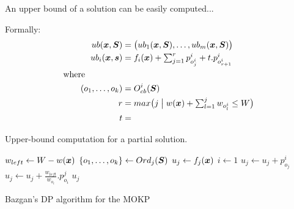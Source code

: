 An upper bound of a solution can be easily computed...

Formally:
\begin{align*}
    ub(\boldsymbol{x}, \boldsymbol{S}) &= \big(ub_1(\boldsymbol{x}, \boldsymbol{S}), \ldots, ub_m(\boldsymbol{x}, \boldsymbol{S})\big) \\
    ub_i(\boldsymbol{x}, \boldsymbol{s}) &= f_i(\boldsymbol{x}) + \textstyle\sum^r_{j=1} p^i_{o^i_j} + t.p^i_{o^i_{r+1}}\\
  \text{where} \phantom{mmmmm} \\
    (o_1, \ldots, o_k) &= O_{cb}^i(\boldsymbol{S}) \\
    r &= max\big( j \;\big|\; w(\boldsymbol{x}) + \textstyle\sum_{l = 1}^j w_{o^i_l} \leq W \big) \\
    t &= \textstyle
\end{align*}

\begin{algorithm}
  \caption{Upper-bound computation for a partial solution.}
  \label{alg:up}
  \begin{algorithmic}[1]
      \State $w_{left} \gets W - w(\boldsymbol{x})$
      \State $\{o_1, \ldots, o_k\} \gets Ord_{j}(\boldsymbol{S})$
      \State $u_j \gets f_j(\boldsymbol{x})$
      \State $i \gets 1$
        \State $u_j \gets u_j + p^i_{o_j}$
      \EndWhile
        \State $u_j \gets u_j + \frac{w_{left}}{w_{o_i}}.p^j_{o_i}$
      \EndIf
      \State \Return $u_j$
    \EndFunction
  \end{algorithmic}
\end{algorithm}


\begin{algorithm}
  \caption{Bazgan's DP algorithm for the MOKP}
  \label{alg:bazgan}
  
\end{algorithm}


